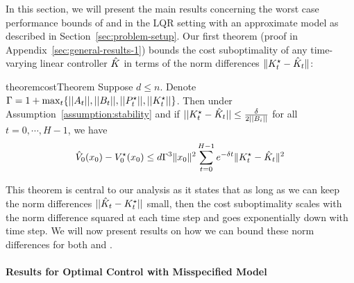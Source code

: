 In this section, we will present the main results concerning the worst
case performance bounds of \MM{} and \ILC{} in the LQR setting with an
approximate model as described in Section~\ref{sec:problem-setup}. Our
first theorem (proof in Appendix~\ref{sec:general-results-1})
bounds the cost suboptimality of any time-varying linear 
controller $\hat{K}$ in terms of the norm differences $\|K^\star_t -
\hat{K}_t\|$:
\begin{restatable}{theorem}{costTheorem}
  \label{theorem:cost}
  Suppose $d \leq n$. Denote
  $\Gamma = 1 + \max_t\{||A_t||, ||B_t||, ||P^\star_t||, ||K^\star_t||\}$. Then under
  Assumption~\ref{assumption:stability} and if $||K^\star_{t} -
  \hat{K}_{t}|| \le \frac{\delta}{2||B_{i}||}$ for all $t=0, \cdots, H-1$, we have
  \begin{equation}
    \label{eq:cost}
    \hat{V}_0(x_0) - V^\star_0(x_0) \leq d\Gamma^{3}\|x_{0}\|^{2} \sum_{t=0}^{H-1} e^{-\delta t}\|K^\star_{t} - \hat{K}_{t}\|^{2}
  \end{equation}
\end{restatable}
This theorem is central to our analysis as it states that as long as we can keep
the norm differences $||\hat{K}_{t} - K^\star_{t}||$ small, then the cost
suboptimality scales 
with the norm difference squared at each time step and goes exponentially down
with time step. %
We will now present results on how we can
bound these norm differences for both \MM{} and \ILC{}.

\paragraph{Results for Optimal Control with Misspecified Model}
\label{sec:optimal-control-with}

